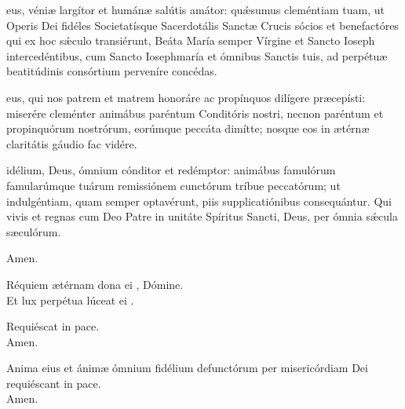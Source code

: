 \medskip

 eus, véniæ largítor et humánæ salútis amátor: qu\'\ae sumus cleméntiam
tuam, ut Operis Dei fidéles Societatísque Sacerdotális
Sanctæ Crucis sócios et benefactóres qui ex hoc s\'\ae culo transiérunt,
Beáta María semper Vírgine et Sancto Ioseph intercedéntibus, cum
Sancto Iosephmaría et ómnibus Sanctis tuis, ad perpétuæ beatitúdinis
consórtium perveníre concédas.
\bigskip

\medskip

 eus, qui nos patrem et matrem honoráre ac propínquos dilígere
præcepísti: miserére cleménter animábus paréntum Conditóris
nostri, nec\-non paréntum et propinquórum nostrórum, eorúmque
peccáta dimítte; nosque eos in ætérnæ claritátis gáudio fac vidére.
\bigskip

\medskip

 idélium, Deus, ómnium cónditor et redémptor: animábus famulórum
famularúmque tuárum remissiónem cunctórum tríbue
peccatórum; ut indulgéntiam, quam semper optavérunt, piis
supplicatiónibus con\-se\-quán\-tur. Qui vivis et regnas cum Deo Patre in unitáte
Spíritus Sancti, Deus, per ómnia s\'\ae cula sæculórum.
\medskip

\ra Amen.


\vspace{3 mm}

\va Réquiem ætérnam dona ei , Dómine.\\
\ra Et lux perpétua lúceat ei .

\vspace{3 mm}

\va Requiéscat  in pace.\\
\ra Amen.

\vspace{3 mm}

\va Anima eius  et ánimæ ómnium fidélium defunctórum
per misericórdiam Dei requiéscant in pace.\\
\ra Amen.